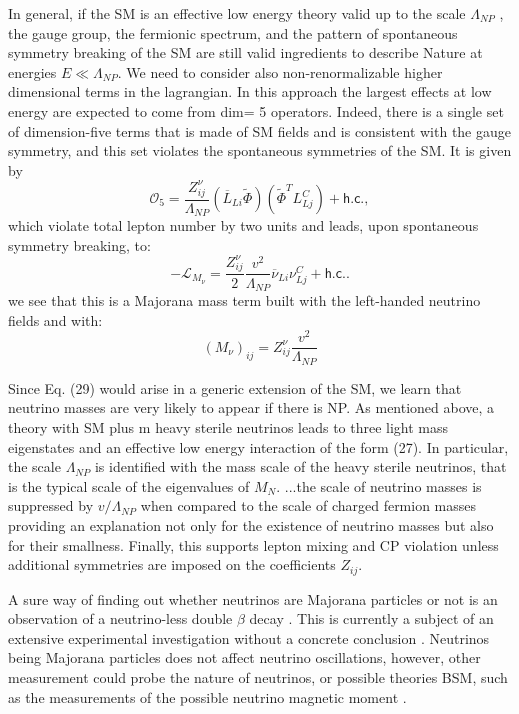 \cite{Gonzalez-GarciaPhenomenologyMassiveNu.pdf} In general, if the SM is an effective low energy theory valid up to the scale $\Lambda_{NP}$ , the gauge group, the fermionic spectrum, and the pattern of spontaneous symmetry breaking of the SM are still valid ingredients to describe Nature at energies $E\ll \Lambda_{NP}$. We need to consider also non-renormalizable higher dimensional terms in the lagrangian. In this approach the largest effects at low energy are expected to come from dim= 5 operators.  Indeed, there is a single set of dimension-five terms that is made of SM fields and is consistent with the gauge symmetry, and this set violates the spontaneous symmetries of the SM. It is given by
\begin{equation}
\mathcal{O}_5=\frac{Z^\nu_{ij}}{\Lambda_{NP}}\left(\overline{L}_{Li}\tilde{\Phi}\right)\left(\tilde{\Phi}^T L_{Lj}^C\right)+\textsf{h.c.},
\end{equation}
which violate total lepton number by two units and leads, upon spontaneous symmetry breaking, to:
\begin{equation}
-\mathcal{L}_{M_\nu}=\frac{Z^\nu_{ij}}{2}\frac{v^2}{\Lambda_{NP}}\overline{\nu}_{Li}\nu_{Lj}^C+\textsf{h.c.}.
\end{equation}
 we see that this is a Majorana mass term built with
the left-handed neutrino fields and with:
\begin{equation}
\left(M_\nu\right)_{ij}=Z^{\nu}_{ij}\frac{v^2}{\Lambda_{NP}}
\end{equation}

\cite{Gonzalez-GarciaPhenomenologyMassiveNu.pdf} Since Eq. (29) would arise in a generic extension of the SM, we learn that neutrino masses are very likely to appear if there is NP. As mentioned above, a theory with SM plus m heavy sterile neutrinos leads to three light mass eigenstates and an effective low energy interaction of the form (27). In particular, the scale $\Lambda_{NP}$ is identified with the mass scale of the heavy sterile neutrinos, that is the typical scale of the eigenvalues of $M_N$. ...the scale of neutrino masses is suppressed by $v/\Lambda_{NP}$ when compared to the scale of charged fermion masses providing an explanation not only for the existence of neutrino masses but also for their smallness. Finally, this supports lepton mixing and CP violation unless additional symmetries are imposed on the coefficients $Z_{ij}$.
\fi

A sure way of finding out whether neutrinos are Majorana particles or not is an observation of a neutrino-less double $\beta$ decay \cite{Gonzalez-GarciaPhenomenologyMassiveNu.pdf}. This is currently a subject of an extensive experimental investigation without a concrete conclusion \cite{PDG.pdf}. Neutrinos being Majorana particles does not affect neutrino oscillations, however, other measurement could probe the nature of neutrinos, or possible theories \gls{BSM}, such as the measurements of the possible neutrino magnetic moment \cite{SnowmassNeutrinoFrontierReport.pdf}.

